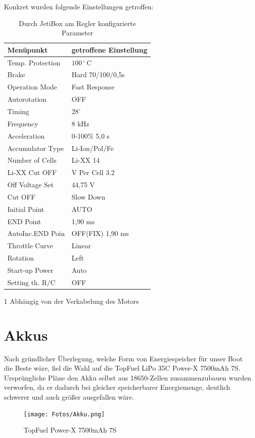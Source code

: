 Konkret wurden folgende Einstellungen getroffen:\\
\begin{table}[h]
\centering
\begin{threeparttable}
    
    \begin{tabular}{|l|l|}
    \hline
     Menüpunkt & getroffene Einstellung \\\hline
     Temp. Protection & $100\,^\circ\,\textrm{C}$\\
     Brake & Hard 70/100/0,5s\\
     Operation Mode & Fast Response\\
     Autorotation & OFF\\
     Timing & $28^\circ$\\
     Frequency & 8 kHz\\
     Acceleration & 0-100\% 5,0 s\\
     Accumulator Type & Li-Ion/Pol/Fe\\
     Number of Cells & Li-XX 14\\
     Li-XX Cut OFF & V Per Cell 3.2\\
     Off Voltage Set & 44,75 V\\
     Cut OFF & Slow Down\\
     Initial Point & AUTO\\
     END Point & 1,90 ms\\
     AutoInc.END Poin & OFF(FIX) 1,90 ms\\
     Throttle Curve & Linear\\
     Rotation & Left \tnote{1}\\
     Start-up Power & Auto\\
     Setting th. R/C & OFF\\\hline
    \end{tabular}
    \begin{tablenotes}\footnotesize 
        \item[1] Abhängig von der Verkabelung des Motors 
        \end{tablenotes}
    \end{threeparttable}
    \caption{Durch JetiBox am Regler konfigurierte Parameter}
\end{table}
\newpage


\section{Akkus}
Nach gründlicher Überlegung, welche Form von Energiespeicher für unser Boot die Beste wäre, fiel die Wahl auf die TopFuel LiPo 35C Power-X 7500mAh 7S.
Ursprüngliche Pläne den Akku selbst aus 18650-Zellen zusammenzubauen wurden verworfen, da er dadurch bei gleicher speicherbarer Energiemenge, deutlich schwerer und auch größer ausgefallen wäre.
\begin{figure}[h]
    \centering
    \texttt{[image: Fotos/Akku.png]}
    \caption{TopFuel Power-X 7500mAh 7S}
\end{figure}

